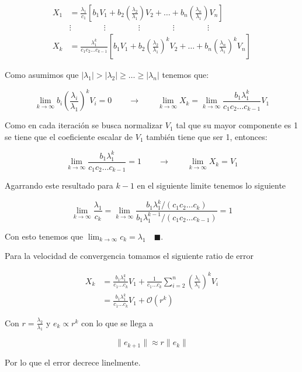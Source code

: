 \begin{align*}
X_{1}&=\frac{\lambda_{1}}{c_{1}} \left[b_{1}V_{1}+b_{2} \left( \frac{\lambda_{2}}{\lambda_{1}} \right)V_{2}+\dots+ b_{n} \left( \frac{\lambda_{n}}{\lambda_{1}} \right)V_{n}\right]  \\
&\vdots \qquad \qquad \vdots \qquad \qquad \vdots \qquad \qquad \vdots \qquad \qquad \vdots \\
X_{k}&=\frac{\lambda_{1}^{k}}{c_{1}c_{2}\dots c_{k-1}} \left[b_{1}V_{1}+b_{2} \left( \frac{\lambda_{2}}{\lambda_{1}} \right)^{k}V_{2}+\dots+ b_{n} \left( \frac{\lambda_{n}}{\lambda_{1}} \right)^{k}V_{n}\right] 
\end{align*}

Como asumimos que $|\lambda_1|>|\lambda_2|\geq\dots\geq|\lambda_n|$ tenemos que:

\begin{equation*}
    \lim_{ k \to \infty } b_{i} \left( \frac{\lambda_{i}}{\lambda_{1}} \right)^{k}V_{i}=0\qquad\rightarrow\qquad \lim_{ k \to \infty } X_{k}=\lim_{ k \to \infty } \frac{b_{1}\lambda_{1}^{k}}{c_{1}c_{2}\dots c_{k-1}}V_{1}
\end{equation*}

Como en cada iteración se busca normalizar $V_1$ tal que  su mayor componente es 1 se tiene que el coeficiente escalar de $V_1$ también tiene que ser 1, entonces:

\begin{equation*}
    \lim_{ k \to \infty } \frac{b_{1}\lambda_{1}^{k}}{c_{1}c_{2}\dots c_{k-1}}=1\qquad\rightarrow\qquad \lim_{ k \to \infty } X_{k}=V_{1}
\end{equation*}

Agarrando este resultado para $k-1$ en el siguiente limite tenemos lo siguiente

\begin{equation*}
    \lim_{ k \to \infty } \frac{\lambda_{1}}{c_{k}}=\lim_{ k \to \infty } \frac{b_{1}\lambda_{1}^{k}/(c_{1}c_{2}\dots c_{k})}{b_{1}\lambda_{1}^{k-1}/(c_{1}c_{2}\dots c_{k-1})}=1
\end{equation*}

Con esto tenemos que $\lim_{ k \to \infty } c_{k}=\lambda_{1}\quad \blacksquare$.

Para la velocidad de convergencia tomamos el siguiente ratio de error

\begin{align*}
X_{k}&=\frac{b_{1}\lambda_{1}^{k}}{c_{1}\dots c_{k}}V_{1}+\frac{1}{c_{1}\dots c_{k}}\sum_{i=2}^{n} \left( \frac{\lambda_{i}}{\lambda_{1}} \right)^{k}V_{i} \\
&=\frac{b_{1}\lambda_{1}^{k}}{c_{1}\dots c_{k}}V_{1}+\mathcal{O}(r^{k})
\end{align*}

Con $r=\frac{\lambda_2}{\lambda_1}$ y $e_{k} \propto r^{k}$ con lo que se llega a

\begin{equation*}
    \| e_{k+1} \| \approx r\| e_{k} \| 
\end{equation*}

Por lo que el error decrece linelmente.